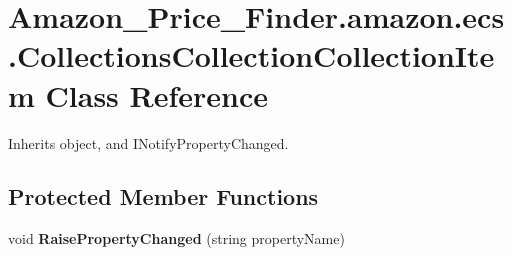 \hypertarget{class_amazon___price___finder_1_1amazon_1_1ecs_1_1_collections_collection_collection_item}{\section{Amazon\-\_\-\-Price\-\_\-\-Finder.\-amazon.\-ecs.\-Collections\-Collection\-Collection\-Item Class Reference}
\label{class_amazon___price___finder_1_1amazon_1_1ecs_1_1_collections_collection_collection_item}
}


 




Inherits object, and I\-Notify\-Property\-Changed.

\subsection*{Protected Member Functions}
\begin{DoxyCompactItemize}
\item 
\hypertarget{class_amazon___price___finder_1_1amazon_1_1ecs_1_1_collections_collection_collection_item_a1f2060987d657c579c4eda71e5df72c0}{void {\bfseries Raise\-Property\-Changed} (string property\-Name)}\label{class_amazon___price___finder_1_1amazon_1_1ecs_1_1_collections_collection_collection_item_a1f2060987d657c579c4eda71e5df72c0}

\end{DoxyCompactItemize}
